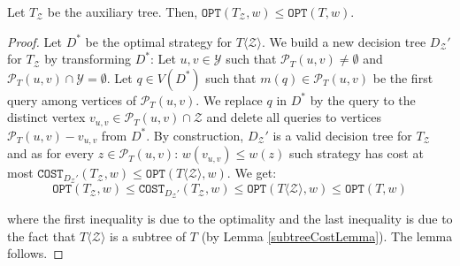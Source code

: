 \documentclass[a4paper, anonymous, numberwithinsect, pdfa, UKenglish,cleveref, autoref, thm-restate]{socg-lipics-v2021}
\newcommand{\br}[1]{\left( #1 \right)}
\newcommand{\angl}[1]{\langle #1 \rangle}
\newcommand{\OPT}{\texttt{OPT}}
\newcommand{\COST}{\texttt{COST}}
\begin{document}
\begin{lemma}\label{auxTreeCostLemma}
    Let $T_{\mathcal{Z}}$ be the auxiliary tree. Then, $\OPT\br{T_{\mathcal{Z}}, w}\leq \OPT\br{T, w}$.
    \begin{proof}
        Let $D^*$ be the optimal strategy for $T\angl{\mathcal{Z}}$. We build a new decision tree $D_{\mathcal{Z}}'$ for $T_{\mathcal{Z}}$ by transforming $D^*$: Let $u,v\in \mathcal{Y}$ such that $\mathcal{P}_{T}\br{u, v}\neq\emptyset$ and $\mathcal{P}_{T}\br{u, v}\cap \mathcal{Y}=\emptyset$. Let $q\in V\br{D^*}$ such that $m\br{q}\in \mathcal{P}_{T}\br{u, v}$ be the first query among vertices of $\mathcal{P}_{T}\br{u, v}$. We replace $q$ in $D^*$ by the query to the distinct vertex $v_{u,v}\in \mathcal{P}_{T}\br{u, v}\cap \mathcal{Z}$ and delete all queries to vertices $\mathcal{P}_{T}\br{u, v}-v_{u,v}$ from $D^*$. By construction, $D_{\mathcal{Z}}'$ is a valid decision tree for $T_{\mathcal{Z}}$ and as for every $z\in \mathcal{P}_{T}\br{u, v}$: $w\br{v_{u,v}}\leq w\br{z}$ such strategy has cost at most $\COST_{D_{\mathcal{Z}}'}\br{T_{\mathcal{Z}}, w}\leq \OPT\br{T\angl{\mathcal{Z}}, w}$. We get:
        $$
        \OPT\br{T_{\mathcal{Z}}, w}\leq \COST_{D_{\mathcal{Z}}'}\br{T_{\mathcal{Z}}, w}\leq \OPT\br{T\angl{\mathcal{Z}}, w}\leq \OPT\br{T, w}
        $$

        where the first inequality is due to the optimality and the last inequality is due to the fact that $T\angl{\mathcal{Z}}$ is a subtree of $T$ (by Lemma \ref{subtreeCostLemma}). The lemma follows.
    \end{proof}
\end{lemma}
\end{document}
